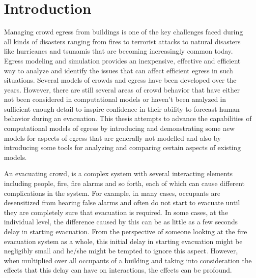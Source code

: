 
\chapter{Introduction}
\label{chapter:Introduction}

Managing crowd egress from buildings is one of the key challenges faced during all kinds of disasters ranging from fires to terrorist attacks to natural disasters like hurricanes and tsunamis that are becoming increasingly common today. Egress modeling and simulation provides an inexpensive, effective and efficient way to analyze and identify the issues that can affect efficient egress in such situations. Several models of crowds and egress have been developed over the years. However, there are still several areas of crowd behavior that have either not been considered in computational models or haven't been analyzed in sufficient enough detail to inspire confidence in their ability to forecast human behavior during an evacuation. This thesis attempts to advance the capabilities of computational models of egress by introducing and demonstrating some new models for aspects of egress that are generally not modelled and also by introducing some tools for analyzing and comparing certain aspects of existing models.


An evacuating crowd, is a complex system with several interacting elements including people, fire, fire alarms and so forth, each of which can cause different complications in the system.  For example, in many cases, occupants are desensitized from hearing false alarms and often do not start to evacuate until they are completely sure that evacuation is required. In some cases, at the individual level, the difference caused by this can be as little as a few seconds delay in starting evacuation. From the perspective of someone looking at the fire evacuation system as a whole, this initial delay in starting evacuation might be negligibly small and he/she might be tempted to ignore this aspect. However, when multiplied over all occupants of a building and taking into consideration the effects that this delay can have on interactions, the effects can be profound.

